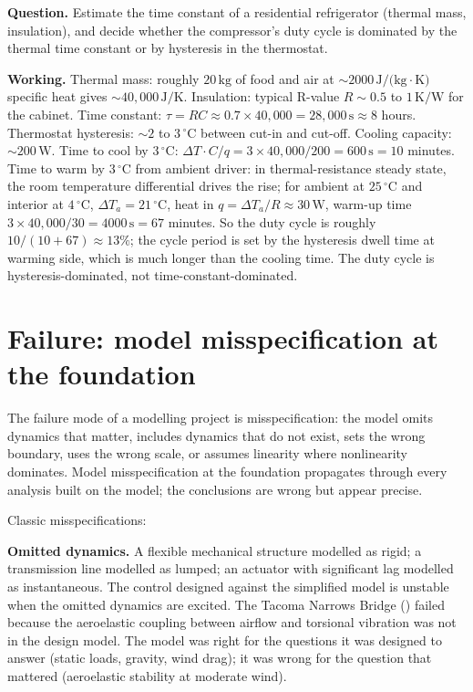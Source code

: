 \begin{estimation}
\textbf{Question.} Estimate the time constant of a residential refrigerator (thermal mass, insulation), and decide whether the compressor's duty cycle is dominated by the thermal time constant or by hysteresis in the thermostat.

\textbf{Working.} Thermal mass: roughly $20\,\text{kg}$ of food and air at $\sim 2000\,\text{J/(kg}\cdot\text{K)}$ specific heat gives $\sim 40{,}000\,\text{J/K}$. Insulation: typical R-value $R \sim 0.5$ to $1\,\text{K/W}$ for the cabinet. Time constant: $\tau = RC \approx 0.7 \times 40{,}000 = 28{,}000\,\text{s} \approx 8$ hours. Thermostat hysteresis: $\sim 2$ to $3\,^\circ\text{C}$ between cut-in and cut-off. Cooling capacity: $\sim 200\,\text{W}$. Time to cool by $3\,^\circ\text{C}$: $\Delta T \cdot C / q = 3 \times 40{,}000 / 200 = 600\,\text{s} = 10$ minutes. Time to warm by $3\,^\circ\text{C}$ from ambient driver: in thermal-resistance steady state, the room temperature differential drives the rise; for ambient at $25\,^\circ\text{C}$ and interior at $4\,^\circ\text{C}$, $\Delta T_a = 21\,^\circ\text{C}$, heat in $q = \Delta T_a / R \approx 30\,\text{W}$, warm-up time $3 \times 40{,}000 / 30 = 4000\,\text{s} = 67$ minutes. So the duty cycle is roughly $10/(10+67) \approx 13\%$; the cycle period is set by the hysteresis dwell time at warming side, which is much longer than the cooling time. The duty cycle is hysteresis-dominated, not time-constant-dominated.
\end{estimation}

\section{Failure: model misspecification at the foundation}

The failure mode of a modelling project is misspecification: the model omits dynamics that matter, includes dynamics that do not exist, sets the wrong boundary, uses the wrong scale, or assumes linearity where nonlinearity dominates. Model misspecification at the foundation propagates through every analysis built on the model; the conclusions are wrong but appear precise.

Classic misspecifications:

\textbf{Omitted dynamics.} A flexible mechanical structure modelled as rigid; a transmission line modelled as lumped; an actuator with significant lag modelled as instantaneous. The control designed against the simplified model is unstable when the omitted dynamics are excited. The Tacoma Narrows Bridge (\cite{acc:tacoma-narrows-1941}) failed because the aeroelastic coupling between airflow and torsional vibration was not in the design model. The model was right for the questions it was designed to answer (static loads, gravity, wind drag); it was wrong for the question that mattered (aeroelastic stability at moderate wind).

